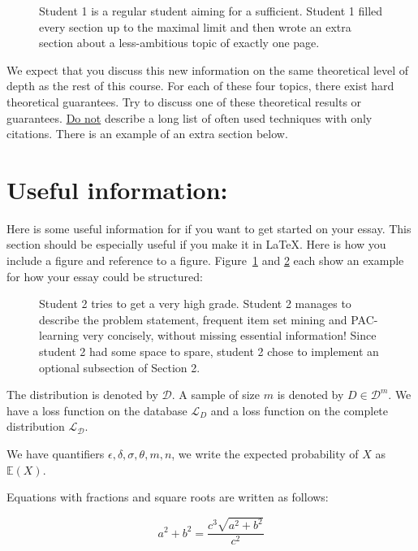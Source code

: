 \documentclass{bigdata}
\begin{document}
\begin{figure}[t]
  \centering
  \caption{Student 1 is a regular student aiming for a sufficient. Student 1 filled every section up to the maximal limit and then wrote an extra section about a less-ambitious topic of exactly one page.}
    \label{fig:student1}
\end{figure}


We expect that you discuss this new information on the same theoretical level of depth as the rest of this course. For each of these four topics, there exist hard theoretical guarantees. Try to discuss one of these theoretical results or guarantees. \underline{Do not} describe a long list of often used techniques with only citations. There is an example of an extra section below.

\section{Useful information:}

Here is some useful information for if you want to get started on your essay. This section should be especially useful if you make it in LaTeX.
Here is how you include a figure and reference to a figure. Figure~\ref{fig:student1} and \ref{fig:student2} each show an example for how your essay could be structured: 

\begin{figure}[t]
  \centering
  \caption{Student 2 tries to get a very high grade. Student 2 manages to describe the problem statement, frequent item set mining and PAC-learning very concisely, without missing essential information! Since student 2 had some space to spare, student 2 chose to implement an optional subsection of Section 2. }
    \label{fig:student2}
\end{figure}

The distribution is denoted by $\mathcal{D}$. A sample of size $m$ is denoted by $D \in \mathcal{D}^m$. We have a loss function on the database $\mathcal{L}_{D}$ and a loss function on the complete distribution $\mathcal{L}_{\mathcal{D}}$.

We have quantifiers $\epsilon, \delta, \sigma, \theta, m, n$, we write the expected probability of $X$ as $\mathbb{E}(X)$. 

Equations with fractions and square roots are written as follows:

\begin{equation}
    a^2 + b^2 = \frac{c^3\sqrt{a^2 + b^2}}{c^2}
\end{equation}
\end{document}

